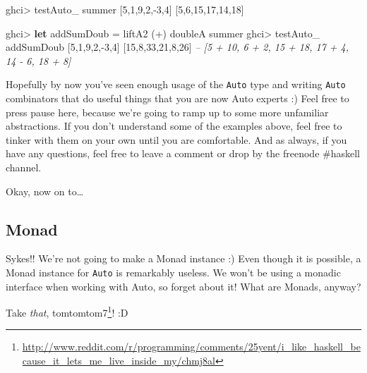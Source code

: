 \documentclass[]{article}
\newenvironment{Shaded}{}{}
\newcommand{\KeywordTok}[1]{\textcolor[rgb]{0.00,0.44,0.13}{\textbf{{#1}}}}
\newcommand{\DecValTok}[1]{\textcolor[rgb]{0.25,0.63,0.44}{{#1}}}
\newcommand{\CommentTok}[1]{\textcolor[rgb]{0.38,0.63,0.69}{\textit{{#1}}}}
\newcommand{\FunctionTok}[1]{\textcolor[rgb]{0.02,0.16,0.49}{{#1}}}
\newcommand{\NormalTok}[1]{{#1}}
\renewcommand{\href}[2]{#2\footnote{\url{#1}}}
\begin{document}
\begin{Shaded}
\begin{Highlighting}[]
\NormalTok{ghci}\FunctionTok{>} \NormalTok{testAuto_ summer [}\DecValTok{5}\NormalTok{,}\DecValTok{1}\NormalTok{,}\DecValTok{9}\NormalTok{,}\DecValTok{2}\NormalTok{,}\FunctionTok{-}\DecValTok{3}\NormalTok{,}\DecValTok{4}\NormalTok{]}
\NormalTok{[}\DecValTok{5}\NormalTok{,}\DecValTok{6}\NormalTok{,}\DecValTok{15}\NormalTok{,}\DecValTok{17}\NormalTok{,}\DecValTok{14}\NormalTok{,}\DecValTok{18}\NormalTok{]}

\NormalTok{ghci}\FunctionTok{>} \KeywordTok{let} \NormalTok{addSumDoub }\FunctionTok{=} \NormalTok{liftA2 (}\FunctionTok{+}\NormalTok{) doubleA summer}
\NormalTok{ghci}\FunctionTok{>} \NormalTok{testAuto_ addSumDoub [}\DecValTok{5}\NormalTok{,}\DecValTok{1}\NormalTok{,}\DecValTok{9}\NormalTok{,}\DecValTok{2}\NormalTok{,}\FunctionTok{-}\DecValTok{3}\NormalTok{,}\DecValTok{4}\NormalTok{]}
\NormalTok{[}\DecValTok{15}\NormalTok{,}\DecValTok{8}\NormalTok{,}\DecValTok{33}\NormalTok{,}\DecValTok{21}\NormalTok{,}\DecValTok{8}\NormalTok{,}\DecValTok{26}\NormalTok{]}
\CommentTok{-- [5 + 10, 6 + 2, 15 + 18, 17 + 4, 14 - 6, 18 + 8]}
\end{Highlighting}
\end{Shaded}

Hopefully by now you've seen enough usage of the \texttt{Auto} type and
writing \texttt{Auto} combinators that do useful things that you are now
Auto experts :) Feel free to press pause here, because we're going to
ramp up to some more unfamiliar abstractions. If you don't understand
some of the examples above, feel free to tinker with them on your own
until you are comfortable. And as always, if you have any questions,
feel free to leave a comment or drop by the freenode \#haskell channel.

Okay, now on to\ldots{}

\subsection{Monad}\label{monad}

Sykes!! We're not going to make a Monad instance :) Even though it is
possible, a Monad instance for \texttt{Auto} is remarkably useless. We
won't be using a monadic interface when working with Auto, so forget
about it! What are Monads, anyway?

Take \emph{that},
\href{http://www.reddit.com/r/programming/comments/25yent/i_like_haskell_because_it_lets_me_live_inside_my/chmj8al}{tomtomtom7}!
:D
\end{document}
